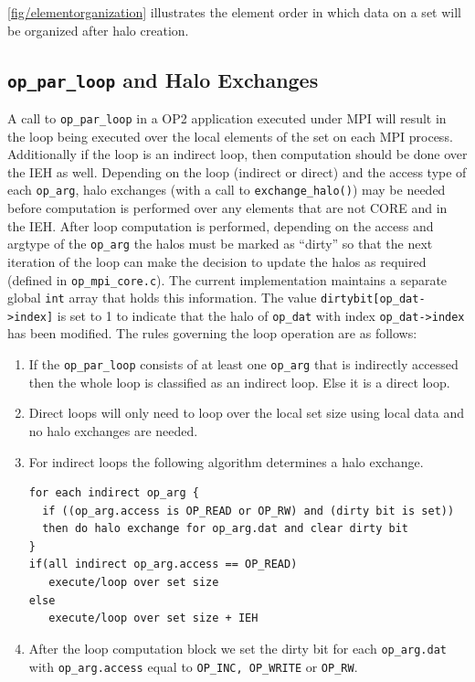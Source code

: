 \documentclass[11pt]{article}
\begin{document}
\noindent \figurename{ \ref{fig/elementorganization}} illustrates the element order in which data on a set will be
organized after halo creation.


\subsection{\texttt{op\_par\_loop} and Halo Exchanges}\label{subsec/exchange}
A call to \texttt{op\_par\_loop} in a OP2 application executed under MPI will result in the loop being executed over
the local elements of the set on each MPI process. Additionally if the loop is an indirect loop, then computation
should be done over the IEH as well. Depending on the loop (indirect or direct) and the access type of each
\texttt{op\_arg}, halo exchanges (with a call to \texttt{exchange\_halo()}) may be needed before computation is
performed over any elements that are not CORE and in the IEH. After loop computation is performed, depending on the
access and argtype of the \texttt{op\_arg} the halos must be marked as ``dirty'' so that the next iteration of the loop
can make the decision to update the halos as required (defined in \texttt{op\_mpi\_core.c}). The current implementation
maintains a separate global \texttt{int} array that holds this information. The value \texttt{dirtybit[op\_dat->index]}
is set to 1 to indicate that the halo of \texttt{op\_dat} with index \texttt{op\_dat->index} has been modified. The
rules governing the loop operation are as follows:
\begin{enumerate}
\item If the \texttt{op\_par\_loop} consists of at least one \texttt{op\_arg} that is indirectly accessed then the
whole loop is classified as an indirect loop. Else it is a direct loop.

\item Direct loops will only need to loop over the local set size using local data and no halo exchanges are needed.

\item For indirect loops the following algorithm determines a halo exchange.
\begin{verbatim}
for each indirect op_arg {
  if ((op_arg.access is OP_READ or OP_RW) and (dirty bit is set))
  then do halo exchange for op_arg.dat and clear dirty bit
}
if(all indirect op_arg.access == OP_READ)
   execute/loop over set size
else
   execute/loop over set size + IEH
\end{verbatim}
\item After the loop computation block we set the dirty bit for each \texttt{op\_arg.dat} with \texttt{op\_arg.access}
equal to \texttt{OP\_INC, OP\_WRITE} or \texttt{OP\_RW}.
\end{enumerate}
\end{document}
